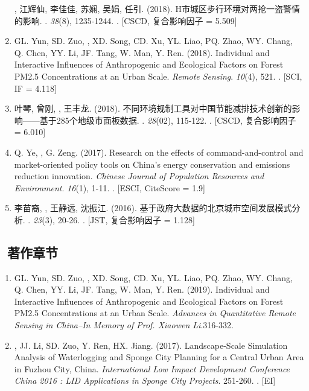 \begin{enumerate}
    {}, 江辉仙, 李佳佳, 苏娴, 吴娟, 任引. (2018).
	H市城区步行环境对两抢一盗警情的影响.
    {}.  \textit{38}(8), 1235-1244.
    . [CSCD, 复合影响因子 = 5.509]
\item
    GL. Yun, SD. Zuo, \Shaoqing, XD. Song, CD. Xu, YL. Liao, PQ. Zhao, WY. Chang, Q. Chen, YY. Li, JF. Tang, W. Man, Y. Ren. (2018).
	Individual and Interactive Influences of Anthropogenic and Ecological Factors on Forest PM2.5 Concentrations at an Urban Scale.
    \textit{Remote Sensing}. \textit{10}(4), 521.
    . [SCI, IF = 4.118]
\item
    叶琴, 曾刚, {}, 王丰龙. (2018).
	不同环境规制工具对中国节能减排技术创新的影响——基于285个地级市面板数据.
    {}. \textit{28}(02), 115-122.
    . [CSCD, 复合影响因子 = 6.010]
\item
    Q. Ye, \Shaoqing, G. Zeng. (2017).
	Research on the effects of command-and-control and market-oriented policy tools on China’s energy conservation and emissions reduction innovation.
    \textit{Chinese Journal of Population Resources and Environment}. \textit{16}(1), 1-11.
    . [ESCI, CiteScore = 1.9]
\item
   李苗裔, {}, 王静远, 沈振江. (2016).
	基于政府大数据的北京城市空间发展模式分析.
    {}. \textit{23}(3), 20-26.
    . [JST, 复合影响因子 = 1.128]
\end{enumerate}

\subsection*{\texorpdfstring{\faBook\ 著作章节}{著作章节}}
\begin{enumerate}
\item
    GL. Yun, SD. Zuo, \Shaoqing, XD. Song, CD. Xu, YL. Liao, PQ. Zhao, WY. Chang, Q. Chen, YY. Li, JF. Tang, W. Man, Y. Ren. (2019).
	Individual and Interactive Influences of Anthropogenic and Ecological Factors on Forest PM2.5 Concentrations at an Urban Scale.
    \textit{Advances in Quantitative Remote Sensing in China–In Memory of Prof. Xiaowen Li}.316-332.
\item
    \Shaoqing, JJ. Li, SD. Zuo, Y. Ren, HX. Jiang. (2017).
	Landscape-Scale Simulation Analysis of Waterlogging and Sponge City Planning for a Central Urban Area in Fuzhou City, China.
    \textit{International Low Impact Development Conference China 2016 : LID Applications in Sponge City Projects}. 251-260.
    . [EI]
\end{enumerate}

